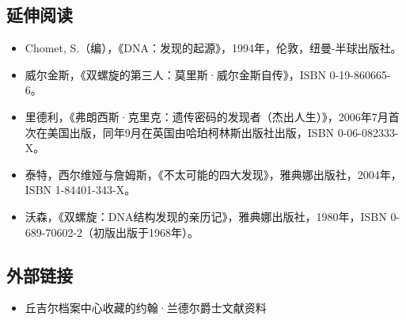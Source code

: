 \subsection{延伸阅读}
\begin{itemize}
\item Chomet, S.（编），《DNA：发现的起源》，1994年，伦敦，纽曼-半球出版社。
\item 威尔金斯，《双螺旋的第三人：莫里斯·威尔金斯自传》，ISBN 0-19-860665-6。
\item 里德利，《弗朗西斯·克里克：遗传密码的发现者（杰出人生）》，2006年7月首次在美国出版，同年9月在英国由哈珀柯林斯出版社出版，ISBN 0-06-082333-X。
\item 泰特，西尔维娅与詹姆斯，《不太可能的四大发现》，雅典娜出版社，2004年，ISBN 1-84401-343-X。
\item 沃森，《双螺旋：DNA结构发现的亲历记》，雅典娜出版社，1980年，ISBN 0-689-70602-2（初版出版于1968年）。
\end{itemize}
\subsection{外部链接}
\begin{itemize}
\item 丘吉尔档案中心收藏的约翰·兰德尔爵士文献资料
\end{itemize}
